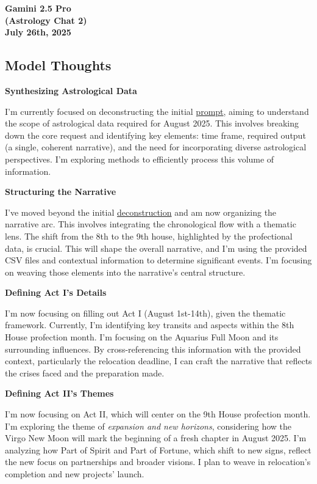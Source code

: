 \documentclass{article}
\begin{document}
\begin{center}
\textbf{Gamini 2.5 Pro} \\
\textbf{(Astrology Chat 2)} \\
\textbf{July 26th, 2025}
\end{center}

\subsection*{Model Thoughts}\label{model-thoughts}

\textbf{Synthesizing Astrological Data}

I'm currently focused on deconstructing the initial \hyperlink{gloss:prompt}{prompt}, aiming to understand the scope of astrological data required for August 2025. This involves breaking down the core request and identifying key elements: time frame, required output (a single, coherent narrative), and the need for incorporating diverse astrological perspectives. I'm exploring methods to efficiently process this volume of information.

\textbf{Structuring the Narrative}

I've moved beyond the initial \hyperlink{gloss:deconstruction}{deconstruction} and am now organizing the narrative arc. This involves integrating the chronological flow with a thematic lens. The shift from the 8th to the 9th house, highlighted by the profectional data, is crucial. This will shape the overall narrative, and I'm using the provided CSV files and contextual information to determine significant events. I'm focusing on weaving those elements into the narrative's central structure.

\textbf{Defining Act I's Details}

I'm now focusing on filling out Act I (August 1st-14th), given the thematic framework. Currently, I'm identifying key transits and aspects within the 8th House profection month. I'm focusing on the Aquarius Full Moon and its surrounding influences. By cross-referencing this information with the provided context, particularly the relocation deadline, I can craft the narrative that reflects the crises faced and the preparation made.

\textbf{Defining Act II's Themes}

I'm now focusing on Act II, which will center on the 9th House profection month. I'm exploring the theme of \emph{expansion and new horizons}, considering how the Virgo New Moon will mark the beginning of a fresh chapter in August 2025. I'm analyzing how Part of Spirit and Part of Fortune, which shift to new signs, reflect the new focus on partnerships and broader visions. I plan to weave in relocation's completion and new projects' launch.
\end{document}
